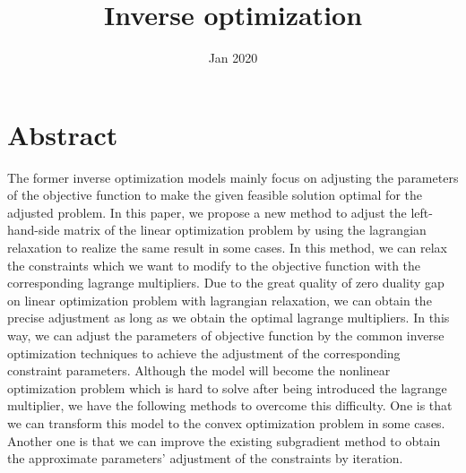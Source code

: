 \documentclass[UTF8]{article}
\title{Inverse optimization}
\date{Jan 2020}
\numberwithin{equation}{section}
\begin{document}
\maketitle{}

\section{Abstract}
The former inverse optimization models mainly focus on adjusting the parameters of the objective function to make the given feasible solution optimal for the adjusted problem. In this paper, we propose a new method to adjust the left-hand-side matrix of the linear optimization problem by using the lagrangian relaxation to realize the same result in some cases. In this method, we can relax the constraints which we want to modify to the objective function with the corresponding lagrange multipliers. Due to the great quality of zero duality gap on linear optimization problem with lagrangian relaxation, we can obtain the precise adjustment as long as we obtain the optimal lagrange multipliers. In this way, we can adjust the parameters of objective function by the common inverse optimization techniques to achieve the adjustment of the corresponding constraint parameters. Although the model will become the nonlinear optimization problem which is hard to solve after being introduced the lagrange multiplier, we have the following methods to overcome this difficulty. One is that we can transform this model to the convex optimization problem in some cases. Another one is that we can improve the existing subgradient method to obtain the approximate parameters' adjustment of the constraints by iteration.

%





\end{document}
